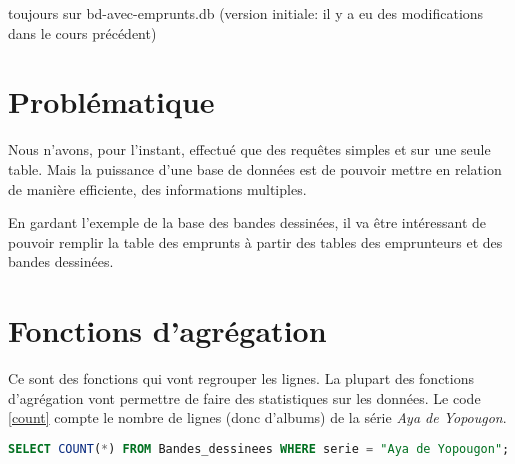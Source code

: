 \documentclass[a4paper,11pt]{article}
\begin{document}
\begin{Form}
\begin{commentprof}
toujours sur bd-avec-emprunts.db (version initiale: il y a eu des modifications dans le cours précédent)
\end{commentprof}
\section{Problématique}
Nous n'avons, pour l'instant, effectué que des requêtes simples et sur une seule table. Mais la puissance d'une base de données est de pouvoir mettre en relation de manière efficiente, des informations multiples. 
\begin{commentprof}
En gardant l'exemple de la base des bandes dessinées, il va être intéressant de pouvoir remplir la table des emprunts à partir des tables des emprunteurs et des bandes dessinées.
\end{commentprof}
\begin{center}
\end{center}
\section{Fonctions d'agrégation}
Ce sont des fonctions qui vont regrouper les lignes. La plupart des fonctions d'agrégation vont permettre de faire des statistiques sur les données. Le code \ref{count} compte le nombre de lignes (donc d'albums) de la série \emph{Aya de Yopougon}.
\begin{center}
\begin{lstlisting}[language=SQL]
SELECT COUNT(*) FROM Bandes_dessinees WHERE serie = "Aya de Yopougon";
\end{lstlisting}
\label{count}
\end{center}


\end{Form}
\end{document}
